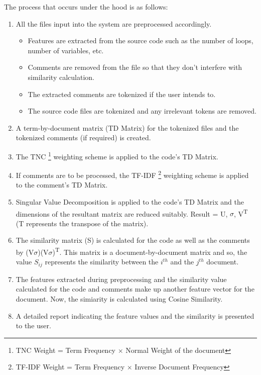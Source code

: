 \documentclass[12pt]{article}
\begin{document}
The process that occurs under the hood is as follows:
\begin{enumerate}
    \item All the files input into the system are preprocessed accordingly.
    \begin{itemize}
        \item Features are extracted from the source code such as the number of loops, number of variables, etc.
        \item Comments are removed from the file so that they don't interfere with similarity calculation.
        \item The extracted comments are tokenized if the user intends to.
        \item The source code files are tokenized and any irrelevant tokens are removed.
    \end{itemize}
    \item A term-by-document matrix (TD Matrix) for the tokenized files and the tokenized comments (if required) is created.
    \item The TNC \footnote{TNC Weight = Term Frequency $\times$ Normal Weight of the document} weighting scheme is applied to the code's TD Matrix.
    \item If comments are to be processed, the TF-IDF \footnote{TF-IDF Weight = Term Frequency $\times$ Inverse Document Frequency} weighting scheme is applied to the comment's TD Matrix.
    \item Singular Value Decomposition is applied to the code's TD Matrix and the dimensions of the resultant matrix are reduced suitably. Result = U, $\sigma$, V\textsuperscript{T} (T represents the transpose of the matrix).
    \item The similarity matrix (S) is calculated for the code as well as the comments by (V$\sigma$)(V$\sigma$)\textsuperscript{T}. This matrix is a document-by-document matrix and so, the value $S_{ij}$ represents the similarity between the $i^{th}$ and the $j^{th}$ document.
    \item The features extracted during preprocessing and the similarity value calculated for the code and comments make up another feature vector for the document. Now, the simiarity is calculated using Cosine Similarity.
    \item A detailed report indicating the feature values and the similarity is presented to the user.
\end{enumerate}
\end{document}
